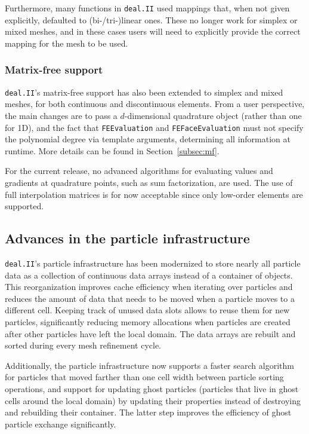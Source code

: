 \documentclass{ansarticle-preprint}
\newcommand{\specialword}[1]{\texttt{#1}}
\newcommand{\dealii}{{\specialword{deal.II}}\xspace}
\begin{document}
Furthermore, many functions in \dealii{} used mappings that, when not
given explicitly, defaulted to (bi-/tri-)linear ones. These no longer
work for simplex or mixed meshes, and in these cases users will need
to explicitly provide the correct mapping for the mesh to be used.


\subsubsection{Matrix-free support}

\dealii{}'s matrix-free support has also been extended to simplex and
mixed meshes, for both
continuous and discontinuous elements. From a user perspective, the main
changes are to pass a $d$-dimensional quadrature object (rather than
one for 1D),
and the fact that \texttt{FEEvaluation} and \texttt{FEFaceEvaluation} must not
specify the polynomial degree via template arguments, determining all
information at runtime. More details can be found in
Section~\ref{subsec:mf}.

For the current release, no advanced algorithms for evaluating values and
gradients at quadrature points, such as sum factorization, are used.
The use of full interpolation matrices is for now acceptable since only low-order elements are
supported.



\subsection{Advances in the particle infrastructure}
\label{subsec:particles}

\dealii 's particle infrastructure has been modernized to store nearly all
particle data as a collection of continuous data arrays instead of a container of
objects. This reorganization improves cache efficiency when iterating over
particles and reduces the amount of data that needs to be moved when a particle
moves to a different cell. Keeping track of unused data slots allows to reuse
them for new particles, significantly reducing memory allocations when
particles are created after other particles have left the local domain. The
data arrays are rebuilt and sorted during every mesh refinement cycle.

Additionally, the particle infrastructure now supports a faster search algorithm
for particles that moved farther than one cell width between particle sorting
operations, and support for updating ghost particles (particles that live in
ghost cells around the local domain) by updating their properties instead of
destroying and rebuilding their container. The latter step improves the
efficiency of ghost particle exchange significantly.
\end{document}
